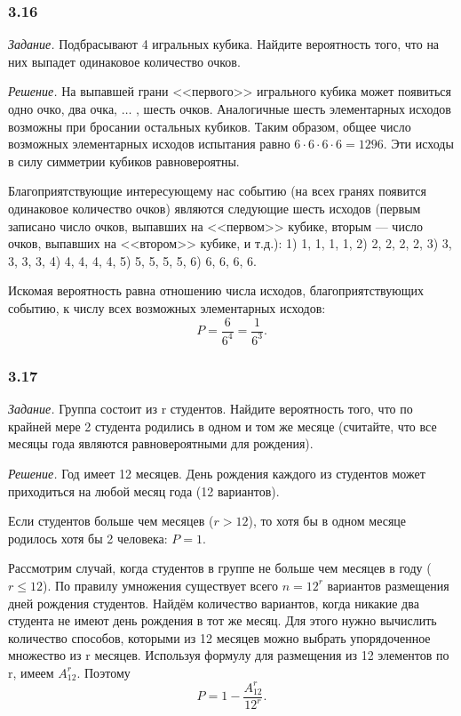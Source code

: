 \subsubsection*{3.16}

\textit{Задание.} Подбрасывают 4 игральных кубика.
Найдите вероятность того, что на них выпадет одинаковое количество очков.

\textit{Решение.} На выпавшей грани <<первого>> игрального кубика может появиться одно очко, два очка,  $ \dotsc $ , шесть очков.
Аналогичные шесть элементарных исходов возможны при бросании остальных кубиков.
Таким образом, общее число возможных элементарных исходов испытания равно $ 6 \cdot 6 \cdot 6 \cdot 6 = 1296 $.
Эти исходы в силу симметрии кубиков равновероятны.

Благоприятствующие интересующему нас событию
(на всех гранях появится одинаковое количество очков)
являются следующие шесть исходов
(первым записано число очков,
выпавших на <<первом>> кубике,
вторым --- число очков, выпавших на <<втором>> кубике, и т.д.): 1) 1, 1, 1, 1, 2) 2, 2, 2, 2, 3) 3, 3, 3, 3, 4) 4, 4, 4, 4, 5) 5, 5, 5, 5, 6) 6, 6, 6, 6.

Искомая вероятность равна отношению числа исходов, благоприятствующих событию, к числу всех возможных элементарных исходов:
$$ P =
\frac{6}{6^4} = \frac{1}{6^3}.$$

\subsubsection*{3.17}

\textit{Задание.} Группа состоит из r студентов.
Найдите вероятность того, что по крайней мере 2 студента родились в одном и том же месяце (считайте, что все месяцы года являются равновероятными для рождения).

\textit{Решение.} Год имеет 12 месяцев.
День рождения каждого из студентов может приходиться на любой месяц года (12 вариантов).

Если студентов больше чем месяцев ($ r > 12 $), то хотя бы в одном месяце родилось хотя бы 2 человека:
$ P = 1 $.

Рассмотрим случай, когда студентов в группе не больше чем месяцев в году ($ r \leq 12 $).
По правилу умножения существует всего $ n = 12^r $ вариантов размещения дней рождения студентов.
Найдём количество вариантов, когда никакие два студента не имеют день рождения в тот же месяц.
Для этого нужно вычислить количество способов, которыми из 12 месяцев можно выбрать упорядоченное множество из r месяцев.
Используя формулу для размещения из 12 элементов по r, имеем $ A_{12}^r $.
Поэтому
$$ P =
1 - \frac{ A_{ 12 }^r }{ 12^r }.$$

